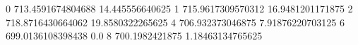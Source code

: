0 713.4591674804688 14.445556640625
1 715.9617309570312 16.9481201171875
2 718.8716430664062 19.8580322265625
4 706.932373046875 7.91876220703125
6 699.0136108398438 0.0
8 700.1982421875 1.18463134765625
